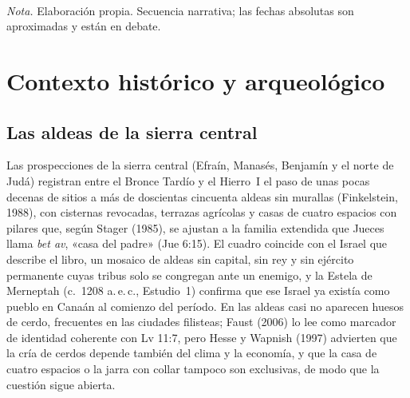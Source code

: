 \documentclass[11pt,letterpaper]{article}
\begin{document}
\begin{center}
\\[2pt]
{\footnotesize\color{sepia}\textit{Nota.} Elaboración propia. Secuencia narrativa; las fechas absolutas son aproximadas y están en debate.}
\end{center}

\section{Contexto histórico y arqueológico}

\subsection{Las aldeas de la sierra central}
Las prospecciones de la sierra central (Efraín, Manasés, Benjamín y el norte de Judá) registran entre el Bronce Tardío y el Hierro~I el paso de unas pocas decenas de sitios a más de doscientas cincuenta aldeas sin murallas (Finkelstein, 1988), con cisternas revocadas, terrazas agrícolas y casas de cuatro espacios con pilares que, según Stager (1985), se ajustan a la familia extendida que Jueces llama \emph{bet av}, «casa del padre» (Jue 6:15). El cuadro coincide con el Israel que describe el libro, un mosaico de aldeas sin capital, sin rey y sin ejército permanente cuyas tribus solo se congregan ante un enemigo, y la Estela de Merneptah (c.~1208 a.\,e.\,c., Estudio~1) confirma que ese Israel ya existía como pueblo en Canaán al comienzo del período. En las aldeas casi no aparecen huesos de cerdo, frecuentes en las ciudades filisteas; Faust (2006) lo lee como marcador de identidad coherente con Lv 11:7, pero Hesse y Wapnish (1997) advierten que la cría de cerdos depende también del clima y la economía, y que la casa de cuatro espacios o la jarra con collar tampoco son exclusivas, de modo que la cuestión sigue abierta.
\end{document}
